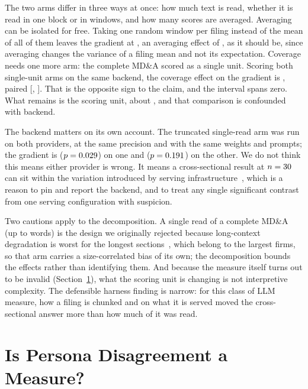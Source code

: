 \documentclass[sigconf,nonacm]{acmart}
\begin{document}
The two arms differ in three ways at once: how much text is read, whether it is read in
one block or in windows, and how many scores are averaged. Averaging can be isolated
for free. Taking one random window per filing instead of the mean of all of them leaves
the gradient at \DecOneWindowGrad, an averaging effect of \DecAggEffect, as it should
be, since averaging changes the variance of a filing mean and not its expectation.
Coverage needs one more arm: the complete MD\&A scored as a single unit. Scoring both
single-unit arms on the same backend, the coverage effect on the gradient is
\DecCoverageEffect, paired \DecCoveragePaired{} [\DecCoveragePairedLo,
\DecCoveragePairedHi]. That is the opposite sign to the claim, and the interval spans
zero. What remains is the scoring unit, about \DecUnitEffect, and that comparison is
confounded with backend.

The backend matters on its own account. The truncated single-read arm was run on both
providers, at the same precision and with the same weights and prompts; the gradient is
\TruncGradient{} ($p=0.029$) on one and \DecTruncSingleGrad{} ($p=0.191$)
on the other. We do not think this means either provider is wrong. It means a
cross-sectional result at $n=30$ can sit within the variation introduced by
serving infrastructure~\cite{atil2024}, which is a reason to pin and report the
backend, and to treat any single significant contrast from one serving configuration
with suspicion.

Two cautions apply to the decomposition. A single read of a complete MD\&A (up to
\MdaWordsMax{} words) is the design we originally rejected because long-context
degradation is worst for the longest sections~\cite{liu2024lost}, which belong to the
largest firms, so that arm carries a size-correlated bias of its own; the decomposition
bounds the effects rather than identifying them. And because the measure itself turns
out to be invalid (Section~\ref{sec:validity}), what the scoring unit is changing is not
interpretive complexity. The defensible harness finding is narrow: for this class of
LLM measure, how a filing is chunked and on what it is served moved the cross-sectional
answer more than how much of it was read.

\section{Is Persona Disagreement a Measure?}
\label{sec:validity}
\end{document}
